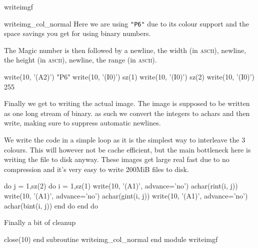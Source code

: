 \documentclass[a4paper]{article}
\begin{document}
\begin{codeblock}{writeimgf}
\begin{codeblock}{writeimg_col_normal}
Here we are using \texttt{"P6"} due to its colour support and the space savings you get for using binary numbers.

The Magic number is then followed by a newline, the width (in \textsc{ascii}), newline, the height (in \textsc{ascii}), newline, the range (in \textsc{ascii}).
\begin{code}
		write(10, '(A2)') "P6"
		write(10, '(I0)') sz(1)
		write(10, '(I0)') sz(2)
		write(10, '(I0)') 255
\end{code}

Finally we get to writing the actual image. The image is supposed to be written as one long stream of binary. as such we convert the integers to achars and then write, making sure to suppress automatic newlines.

We write the code in a simple loop as it is the simplest way to interleave the 3 colours. This will however not be cache efficient, but the main bottleneck here is writing the file to disk anyway. These images get large real fast due to no compression and it's very easy to write 200MiB files to disk.
\begin{code}
		do j = 1,sz(2)
			do i = 1,sz(1)
				write(10, '(A1)', advance='no') achar(rint(i, j))
				write(10, '(A1)', advance='no') achar(gint(i, j))
				write(10, '(A1)', advance='no') achar(bint(i, j))
			end do
		end do
\end{code}

Finally a bit of cleanup

\begin{code}
		close(10)
	end subroutine writeimg_col_normal
end module writeimgf
\end{code}
\end{codeblock}
\end{codeblock}



\printindex
\end{document}

